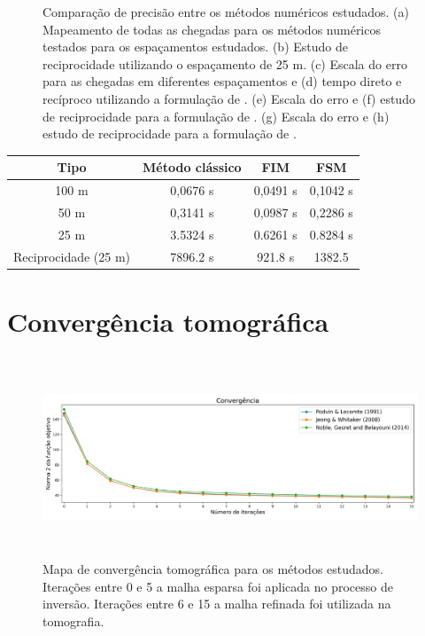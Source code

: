 \begin{figure}[H]
	\caption{Comparação de precisão entre os métodos numéricos estudados. (a) Mapeamento de todas as chegadas para os métodos numéricos testados para os espaçamentos estudados. (b) Estudo de reciprocidade utilizando o espaçamento de 25 m. (c) Escala do erro para as chegadas em diferentes espaçamentos e (d) tempo direto e recíproco utilizando a formulação de . (e) Escala do erro e (f) estudo de reciprocidade para a formulação de . (g) Escala do erro e (h) estudo de reciprocidade para a formulação de .}
	\label{fig:resultsNumericalComparison}
\end{figure}

\begin{table}[H]
	\begin{tabular}{|c|c|c|c|}
		\hline  
		Tipo                 & Método clássico & FIM       & FSM       \\ \hline
		100 m                & 0,0676 s        & 0,0491 s  & 0,1042 s  \\
		50 m                 & 0,3141 s        & 0,0987 s  & 0,2286 s  \\
		25 m                 & 3.5324 s        & 0.6261 s  & 0.8284 s  \\
		Reciprocidade (25 m) & 7896.2 s        & 921.8 s   & 1382.5    \\ \hline
	\end{tabular}
\end{table}






\section{Convergência tomográfica}

\begin{figure}[H]
	\centering
	\includegraphics[width=16cm,height=6cm]{Imgs/Resultados/convergencia.png}
	\caption{Mapa de convergência tomográfica para os métodos estudados. Iterações entre 0 e 5 a malha esparsa foi aplicada no processo de inversão. Iterações entre 6 e 15 a malha refinada foi utilizada na tomografia.}
	\label{fig:convergencia}	
\end{figure}



